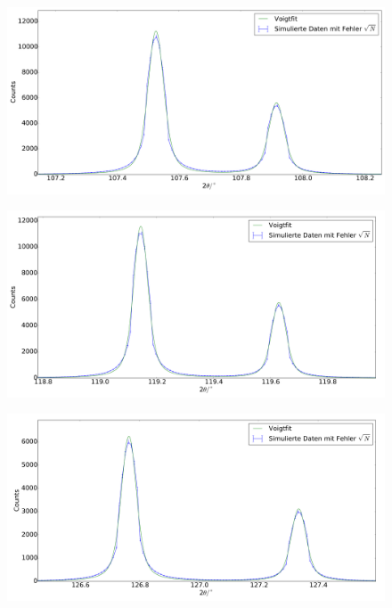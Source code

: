 \begin{figure}[H]
\begin{minipage}{.52\textwidth}
  \centering
  \includegraphics[scale=0.18]{Simulation_Germaniumpulver_9}
  \label{fig:pul_sim_ger_9}
\end{minipage}
\hspace{0.2cm}
\begin{minipage}{.52\textwidth}
  \centering
  \includegraphics[scale=0.18]{Simulation_Germaniumpulver_10}
  \label{fig:pul_sim_ger_10}
\end{minipage}
\end{figure}
\begin{figure}[H]
\begin{minipage}[c]{.52\textwidth}
  \centering
  \includegraphics[scale=0.18]{Simulation_Germaniumpulver_11}
  \label{fig:pul_sim_ger_11}
\end{minipage}
\end{figure}

